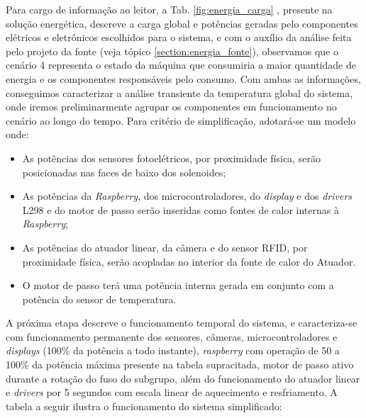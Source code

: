 Para cargo de informação ao leitor, a Tab. \ref{fig:energia_carga} , presente na solução energética, descreve a carga global e potências geradas pelo componentes elétricos e eletrônicos escolhidos para o sistema, e com o auxílio da análise feita pelo projeto da fonte (veja tópico \ref{section:energia_fonte}), observamos que o cenário 4 representa o estado da máquina que consumiria a maior quantidade de energia e os componentes responsáveis pelo consumo. Com ambas as informações, conseguimos caracterizar a análise transiente da temperatura global do sistema, onde iremos preliminarmente agrupar os componentes em funcionamento no cenário ao longo do tempo. Para critério de simplificação, adotará-se um modelo onde:
\begin{itemize}
    \item As potências dos sensores fotoelétricos, por proximidade física, serão posicionadas nas faces de baixo dos solenoides;
    \item As potências da \textit{Raspberry}, dos microcontroladores, do \textit{display} e dos \textit{drivers} L298 e do motor de passo serão inseridas como fontes de calor internas à \textit{Raspberry};
    \item As potências do atuador linear, da câmera e do sensor RFID, por proximidade física, serão acopladas no interior da fonte de calor do Atuador. 
    \item O motor de passo terá uma potência interna gerada em conjunto com a potência do sensor de temperatura.
\end{itemize}

A próxima etapa descreve o funcionamento temporal do sistema, e caracteriza-se com funcionamento permanente dos sensores, câmeras, microcontroladores e \textit{displays} (100\% da potência a todo instante), \textit{raspberry} com operação de 50 a 100\% da potência máxima presente na tabela supracitada, motor de passo ativo durante a rotação do fuso do subgrupo, além do funcionamento do atuador linear e \textit{drivers} por 5 segundos com escala linear de aquecimento e resfriamento. A tabela a seguir ilustra o funcionamento do sistema simplificado:

